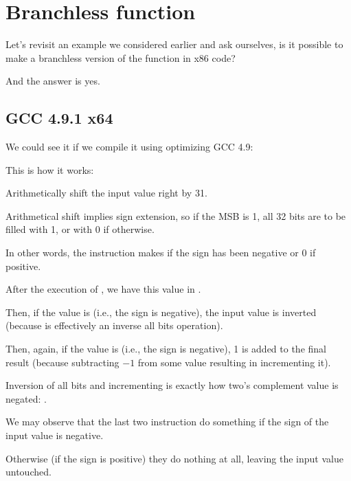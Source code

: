 \section{Branchless  function}
\label{chap:branchless_abs}

Let's revisit an example we considered earlier  and ask ourselves, is it possible
to make a branchless version of the function in x86 code?



And the answer is yes.

\subsection{\Optimizing GCC 4.9.1 x64}

We could see it if we compile it using optimizing GCC 4.9:



This is how it works:

Arithmetically shift the input value right by 31.

Arithmetical shift implies sign extension, so if the \ac{MSB} is 1, 
all 32 bits are to be filled with 1, or with 0 if otherwise.

In other words, the  instruction makes  if the sign has been negative or 0 if positive.

After the execution of , we have this value in \EDX.

Then, if the value is  (i.e., the sign is negative), the input value is inverted \\
(because  is effectively an inverse all bits operation).

Then, again, if the value is  (i.e., the sign is negative), 1 is added to the final result (because
subtracting $-1$ from some value resulting in incrementing it).

Inversion of all bits and incrementing is exactly how two's complement value is negated: 
.

We may observe that the last two instruction do something if the sign of the input value is negative.

Otherwise (if the sign is positive) they do nothing at all, leaving the input value untouched.

